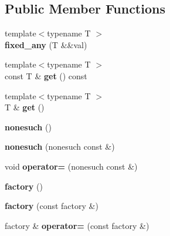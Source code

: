 \subsection*{Public Member Functions}
\begin{CompactItemize}
\item 
\hypertarget{classhope_1_1final_0975f59458d62215cbaf0e69c4cc937c}{
{\footnotesize template$<$typename T $>$ }\\\textbf{fixed\_\-any} (T \&\&val)}
\label{classhope_1_1final_0975f59458d62215cbaf0e69c4cc937c}

\item 
\hypertarget{classhope_1_1final_e325e53d4738f0c8228b11c3dceb70e2}{
{\footnotesize template$<$typename T $>$ }\\const T \& \textbf{get} () const }
\label{classhope_1_1final_e325e53d4738f0c8228b11c3dceb70e2}

\item 
\hypertarget{classhope_1_1final_1c7929ca77ce3a3edc9c554fe9080463}{
{\footnotesize template$<$typename T $>$ }\\T \& \textbf{get} ()}
\label{classhope_1_1final_1c7929ca77ce3a3edc9c554fe9080463}

\item 
\hypertarget{classhope_1_1final_e61301b86f3346e0690e983cdbd595d5}{
\textbf{nonesuch} ()}
\label{classhope_1_1final_e61301b86f3346e0690e983cdbd595d5}

\item 
\hypertarget{classhope_1_1final_b05b8c165d7459649e2328b3f878bad2}{
\textbf{nonesuch} (nonesuch const \&)}
\label{classhope_1_1final_b05b8c165d7459649e2328b3f878bad2}

\item 
\hypertarget{classhope_1_1final_275c7f0352a663922e3c2b6a36e521cf}{
void \textbf{operator=} (nonesuch const \&)}
\label{classhope_1_1final_275c7f0352a663922e3c2b6a36e521cf}

\item 
\hypertarget{classhope_1_1final_45011c8067ecc50c4482d3bc98597b93}{
\textbf{factory} ()}
\label{classhope_1_1final_45011c8067ecc50c4482d3bc98597b93}

\item 
\hypertarget{classhope_1_1final_3095d86896dfed9f34941e0c84644b7f}{
\textbf{factory} (const factory \&)}
\label{classhope_1_1final_3095d86896dfed9f34941e0c84644b7f}

\item 
\hypertarget{classhope_1_1final_f33b5129efa38dd78067646df5f41acd}{
factory \& \textbf{operator=} (const factory \&)}
\label{classhope_1_1final_f33b5129efa38dd78067646df5f41acd}


\end{CompactItemize}
